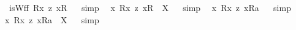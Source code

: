 \begin{isabellebody}
\ {\isachardoublequoteopen}{\isasymnot}\ isWff\ {\isacharparenleft}{\isacharless}R{}{\isasymbullet}{\isachardot}x{\isachardot}{\isachargreater}\ {\isasymrightarrow}\isactrlsup z\ {\isacharless}{\isachardot}x{\isachardot}{\isasymcirc}R{}{\isachargreater}{\isacharparenright}{\isachardoublequoteclose}%
\isadelimproof
\ %
\endisadelimproof
%
\isatagproof
{}\isamarkupfalse%
\ {\isacharparenleft}simp{\isacharparenright}\ \isamarkupfalse%
%
\endisatagproof
{\isafoldproof}%
%
\isadelimproof
%
\endisadelimproof
\isanewline
{}\isamarkupfalse%
\ {\isachardoublequoteopen}{\isasymlambda}x{\isachardot}\ {\isacharless}R{}{\isasymbullet}{\isachardot}x{\isachardot}{\isachargreater}\ {\isasymrightarrow}\isactrlsup z\ {\isacharless}{\isachardot}x{\isachardot}{\isasymcirc}R{}{\isachargreater}{\isacharparenright}\ {\isacharequal}\ X{\isachardoublequoteclose}%
\isadelimproof
\ %
\endisadelimproof
%
\isatagproof
{}\isamarkupfalse%
\ {\isacharparenleft}simp{\isacharparenright}\ \isamarkupfalse%
%
\endisatagproof
{\isafoldproof}%
%
\isadelimproof
%
\endisadelimproof
\isanewline
\isanewline
{}\isamarkupfalse%
\ {\isachardoublequoteopen}{\isacharbrackleft}{\isacharless}{\isasymlambda}x{\isachardot}\ {\isacharless}R{}{\isasymbullet}{\isachardot}x{\isachardot}{\isachargreater}\ {\isasymrightarrow}\isactrlsup z\ {\isacharless}{\isachardot}x{\isachardot}{\isasymcirc}R{}{\isachargreater}{\isacharparenright}{\isasymbullet}a{\isachargreater}{\isacharbrackright}{\isachardoublequoteclose}%
\isadelimproof
\ %
\endisadelimproof
%
\isatagproof
{}\isamarkupfalse%
\ {\isacharparenleft}simp{\isacharparenright}\ \isamarkupfalse%
%
\endisatagproof
{\isafoldproof}%
%
\isadelimproof
%
\endisadelimproof
\isanewline
{}\isamarkupfalse%
\ {\isachardoublequoteopen}{\isacharless}{\isasymlambda}x{\isachardot}\ {\isacharless}R{}{\isasymbullet}{\isachardot}x{\isachardot}{\isachargreater}\ {\isasymrightarrow}\isactrlsup z\ {\isacharless}{\isachardot}x{\isachardot}{\isasymcirc}R{}{\isachargreater}{\isacharparenright}{\isasymbullet}a{\isachargreater}\ {\isacharequal}\ X{\isachardoublequoteclose}%
\isadelimproof
\ %
\endisadelimproof
%
\isatagproof
{}\isamarkupfalse%
\ {\isacharparenleft}simp{\isacharparenright}\ \isamarkupfalse%

\end{isabellebody}

